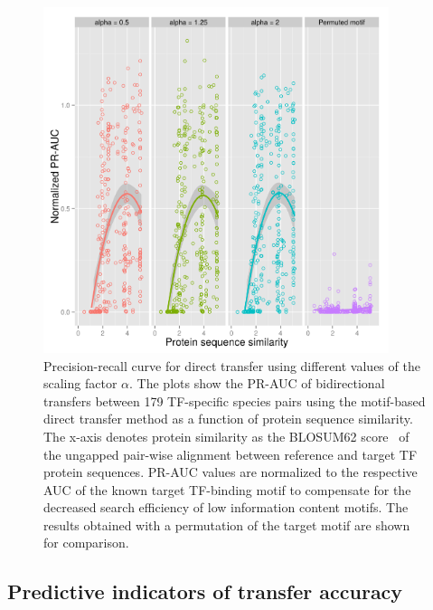 \begin{figure}
  \centering
  \includegraphics[width=0.9\textwidth]{figures/chapter3/direct-transfer-alpha}
  \caption[Precision-recall curve for direct transfer using different values of
  the scaling factor $\alpha$.]{Precision-recall curve for direct transfer
    using different values of the scaling factor $\alpha$. The plots show the
    PR-AUC of bidirectional transfers between 179 TF-specific species pairs
    using the motif-based direct transfer method as a function of protein
    sequence similarity. The x-axis denotes protein similarity as the BLOSUM62
    score~\citep{henikoff1992amino} of the ungapped pair-wise alignment between
    reference and target TF protein sequences. PR-AUC values are normalized to
    the respective AUC of the known target TF-binding motif to compensate for
    the decreased search efficiency of low information content motifs. The
    results obtained with a permutation of the target motif are shown for
    comparison.}
\label{fig:direct-transfer-alpha}
\end{figure}

\subsection{Predictive indicators of transfer accuracy}

